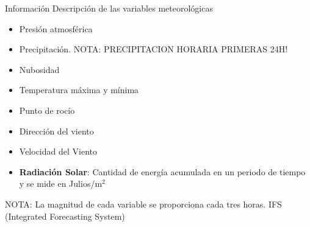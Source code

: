\documentclass[[a4paper,landscape]{article}\usepackage[]{graphicx}\usepackage[]{color}
\begin{document}



\vspace{5cm}
\newpage


\textcolor{meteoblue}{Informaci\'on}
Descripción de las variables meteorol\'ogicas
\begin{itemize}
\item Presi\'on atmosf\'erica
\item Precipitaci\'on. NOTA: PRECIPITACION HORARIA PRIMERAS 24H!
\item Nubosidad
\item Temperatura máxima y mínima
\item Punto de rocío
\item Direcci\'on del viento
\item Velocidad del Viento
\item \textbf{Radiaci\'on Solar}: Cantidad de energía acumulada en un periodo de tiempo y se mide en Julios/m$^2$
\end{itemize}
NOTA: La magnitud de cada variable se proporciona cada tres horas.
IFS (Integrated Forecasting System)
\end{document}
